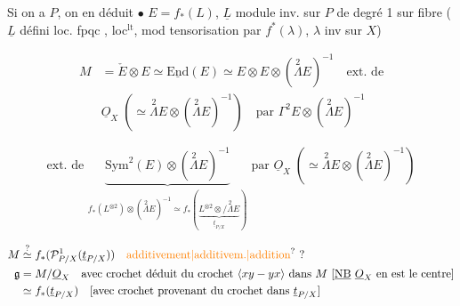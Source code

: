 Si on a $P$, on en déduit $\bullet$ $E=f_*(L)$, $\underline L$ module inv. sur $P$ de degré 1 sur  fibre ($\underline L$ défini loc. fpqc , loc$^{\mathrm{lt}}$, mod tensorisation par $f^*(\lambda)$, $\lambda$ inv sur $X$)

\[ \begin{aligned}
 M&=\check E\otimes E\simeq\underline{\mathrm{End}}(E)\simeq E\otimes E\otimes(\overset2\Lambda E)^{-1}\quad\text{ext. de}\\
 &\underline O_X\;(\simeq\overset2\Lambda E\otimes(\overset2\Lambda E)^{-1})\quad\text{par }\Gamma^2E\otimes(\overset2\Lambda E)^{-1}
 \end{aligned} \]

\[ \text{ext. de }\underbrace{\mathrm{Sym}^2(E)\otimes(\overset2\Lambda E)^{-1}}_{f_*(L^{\otimes2})\otimes(\overset2\Lambda E)^{-1}\simeq f_*(\underbrace{L^{\otimes2}\otimes/\overset2\Lambda E}_{\underline t_{P/X}})}
 \text{ par }\underline O_X\;(\simeq\overset2\Lambda E\otimes(\overset2\Lambda E)^{-1}) \]





\[ \begin{aligned}
 M&\overset{?}{\simeq}f_*(\mathcal P^1_{P/X}(\underline t_{P/X}))\quad\text{\unsure{additivement|additivem.|addition} ?}\\
 \mathfrak g&=M/\underline O_X \quad\text{avec crochet déduit du crochet }\inserted{xy-yx}\text{ dans }M\ [\underline{\mathrm{NB}}\ \underline O_X\text{ en est le centre}]\\
 &\simeq f_*(\underline t_{P/X})\quad [\text{avec crochet provenant du crochet dans }\underline t_{P/X}]
 \end{aligned} \]

